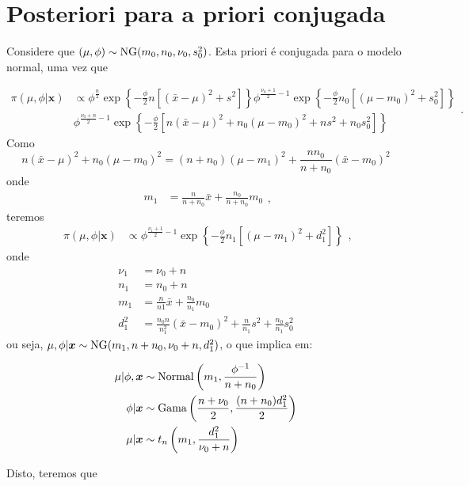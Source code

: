 \documentclass[
  letterpaper,
  DIV=11,
  numbers=noendperiod]{scrreprt}
\theoremstyle{definition}
\theoremstyle{plain}
\theoremstyle{definition}
\theoremstyle{remark}
\begin{document}
\section{Posteriori para a priori
conjugada}\label{posteriori-para-a-priori-conjugada}

Considere que \((\mu,\phi)\sim \hbox{NG}(m_0,n_0,\nu_0,s^2_0)\). Esta
priori é conjugada para o modelo normal, uma vez que

\[\begin{align}
\pi(\mu,\phi|\boldsymbol{x})&\propto \phi^{\frac{n}{2}}\exp\left\{-\frac{\phi}{2}n\left[(\bar{x}-\mu)^2+ s^2\right]\right\}\phi^{\frac{\nu_0+1}{2}-1}\exp\left\{-\frac{\phi}{2}n_0\left[(\mu-m_0)^2 + s_0^2\right]\right\}\\
&\phi^{\frac{\nu_0+n}{2}-1}\exp\left\{-\frac{\phi}{2}\left[n(\bar{x}-\mu)^2 + n_0(\mu-m_0)^2+ns^2 + n_0s^2_0\right]\right\}\end{align}.\]
Como
\[n(\bar{x}-\mu)^2 +n_0(\mu-m_0)^2 = (n+n_0)(\mu-m_1)^2+\frac{n n_0}{n+n_0}(\bar{x}-m_0)^2\]
onde \[\begin{align}
m_1&=\frac{n}{n+n_0}\bar{x}+\frac{n_0}{n+n_0}m_0
\end{align},\] teremos \[\begin{align}
\pi(\mu,\phi|\boldsymbol{x})&\propto \phi^{\frac{\nu_1+1}{2}-1}\exp\left\{-\frac{\phi}{2}n_1\left[(\mu-m_1)^2 + d_1^2\right]\right\}\end{align},\]
onde \[\begin{align}
\nu_1&=\nu_0+n\\
n_1&=n_0+n\\
m_1&=\frac{n}{n1}\bar{x}+\frac{n_0}{n_1}m_0\\
d_1^2& = \frac{n_0n}{n_1^2}(\bar{x}-m_0)^2+\frac{n}{n_1}s^2 + \frac{n_0}{n_1}s^2_0
\end{align}\] ou seja,
\(\mu,\phi|\boldsymbol{x}\sim\hbox{NG}(m_1,n+n_0,\nu_0+n,d_1^2)\), o que
implica em:

\[\begin{align}
\mu|\phi,\boldsymbol{x}&\sim\hbox{Normal}\left(m_1,\frac{\phi^{-1}}{n+n_0}\right)\\
\phi|\boldsymbol{x}&\sim\hbox{Gama}\left(\frac{n+\nu_0}{2},\frac{(n+n_0)d_1^2}{2}\right)\\
\mu|\boldsymbol{x}&\sim t_{n}\left(m_1,\frac{d^2_1}{\nu_0+n}\right)
\end{align}\]

Disto, teremos que
\end{document}
